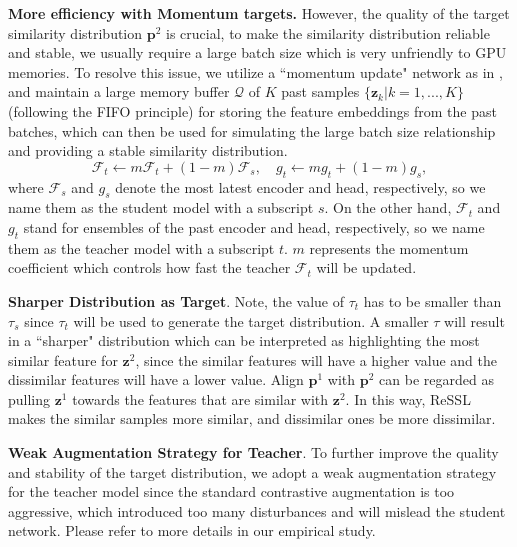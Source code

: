 \documentclass{article}
\newcommand{\<}{\left\langle}
\renewcommand{\>}{\right\rangle}
\begin{document}
\textbf{More efficiency with Momentum targets.} 
However, the quality of the target similarity distribution $\mathbf{p}^2$ is crucial, to make the similarity distribution reliable and stable, we usually require a large batch size which is very unfriendly to GPU memories. To resolve this issue, we utilize a ``momentum update" network as in \cite{moco, mocov2}, and maintain a large memory buffer $\mathcal{Q}$ of $K$ past samples $\{\mathbf{z}_k | k = 1, ... , K \}$ (following the FIFO principle) for storing the feature embeddings from the past batches, which can then be used for simulating the large batch size relationship and providing a stable similarity distribution. 
\begin{equation} \label{equation:ema}
    \mathcal{F}_t \leftarrow m \mathcal{F}_t + (1 - m)\mathcal{F}_s, \quad  g_t \leftarrow m g_t + (1 - m) g_s,
\end{equation}
where $\mathcal{F}_s$ and $g_s$ denote the most latest encoder and head, respectively, so we name them as the student model with a subscript $s$. On the other hand, $\mathcal{F}_t$ and $g_t$ stand for ensembles of the past encoder and head, respectively, so we name them as the teacher model with a subscript $t$. $m$ represents the momentum coefficient which controls how fast the teacher $\mathcal{F}_t$ will be updated.

\textbf{Sharper Distribution as Target}.
 Note, the value of $\tau_t$ has to be smaller than $\tau_s$ since $\tau_t$ will be used to generate the target distribution. A smaller $\tau$ will result in a ``sharper" distribution which can be interpreted as highlighting the most similar feature for $\mathbf{z}^2$, since the similar features will have a higher value and the dissimilar features will have a lower value. Align $\mathbf{p}^1$ with $\mathbf{p}^2$ can be regarded as pulling $\mathbf{z}^1$ towards the features that are similar with $\mathbf{z}^2$. In this way, ReSSL makes the similar samples more similar, and dissimilar ones be more dissimilar.

\textbf{Weak Augmentation Strategy for Teacher}.
To further improve the quality and stability of the target distribution, we adopt a weak augmentation strategy for the teacher model since the standard contrastive augmentation is too aggressive, which introduced too many disturbances and will mislead the student network. Please refer to more details in our empirical study. 
\end{document}
